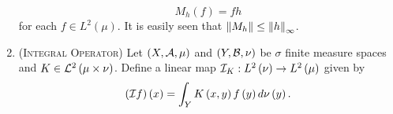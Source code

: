 \begin{enumerate}
    \begin{equation*}
	M_{h} \left( f \right) = fh
    \end{equation*}
    for each $f\in L^{2} \left( \mu \right)$. It is easily seen that $\left\lVert M_{h} \right\rVert \le \left\lVert h \right\rVert_{\infty}$.
\item (\textsc{Integral Operator}) Let $\left( X, {\cal A}, \mu \right)$ and $\left( Y, {\cal B}, \nu \right)$ be $\sigma$ finite measure spaces and $K \in {\cal L} ^{2} \left( \mu \times \nu \right)$. Define a linear map ${\cal I} _{K} : L^{2} \left( \nu \right) \to L^{2} \left( \mu \right)$ given by 
    \begin{equation*}
	\left( {\cal I} f \right) \left( x \right) = \int_{Y} K\left( x,y \right) f\left( y \right) d\nu \left( y \right).
    \end{equation*}
\end{enumerate}
